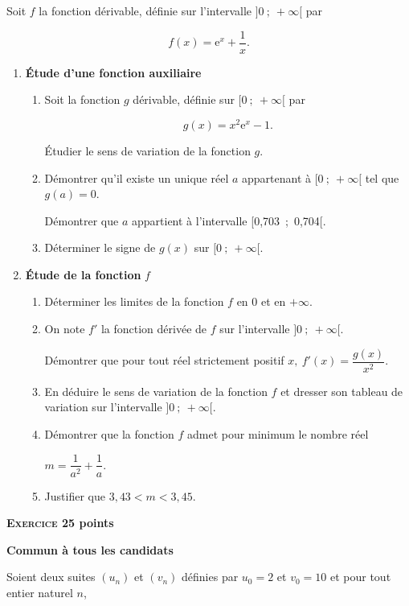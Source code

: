 \documentclass[10pt]{article}
\begin{document}
Soit $f$ la fonction dérivable, définie sur l'intervalle $]0~;~ +\infty[$ par 

\[f(x) = \text{e}^x + \dfrac{1}{x}.\] 
 
\begin{enumerate}
\item \textbf{Étude d'une fonction auxiliaire} 
	\begin{enumerate}
		\item Soit la fonction $g$ dérivable, définie sur $[0~;~ +\infty[$ par 
		
\[g(x) = x^2\text{e}^x - 1.\]
		 
Étudier le sens de variation de la fonction $g$. 
		\item Démontrer qu'il existe un unique réel $a$ appartenant à $[0~;~ +\infty[$ tel que $g(a) = 0$.
		 
Démontrer que $a$ appartient à l'intervalle [0,703~;~0,704[. 
		\item Déterminer le signe de $g(x)$ sur $[0~;~ +\infty[$.
	\end{enumerate} 
\item \textbf{Étude de la fonction } \boldmath $f$ \unboldmath 
	\begin{enumerate}
		\item Déterminer les limites de la fonction $f$ en $0$ et en $+ \infty$. 
		\item On note $f'$ la fonction dérivée de $f$ sur l'intervalle $]0~;~ +\infty[$.
		 
Démontrer que pour tout réel strictement positif $x,\: f'(x) =  \dfrac{g(x)}{x^2}$. 
		\item En déduire le sens de variation de la fonction $f$ et dresser son tableau de variation sur l'intervalle $]0~;~ +\infty[$. 
		\item Démontrer que la fonction $f$ admet pour minimum le nombre réel 
		
$m = \dfrac{1}{a^2} + \dfrac{1}{a}$. 
		\item Justifier que $3,43 < m < 3,45$.
	\end{enumerate} 
\end{enumerate}

\vspace{0,5cm}

\textbf{\textsc{Exercice 2}\hfill 5 points}

\textbf{Commun à tous les candidats}

\medskip

Soient deux suites $\left(u_{n}\right)$ et $\left(v_{n}\right)$ définies par $u_{0} = 2$ et $v_{0} = 10$ et pour tout entier naturel $n$,
  		 
\end{document}
